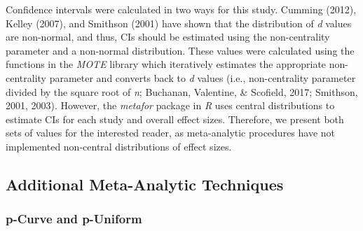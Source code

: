 \documentclass[man]{apa6}
\theoremstyle{definition}
\theoremstyle{definition}
\theoremstyle{definition}
\theoremstyle{remark}
\begin{document}
Confidence intervals were calculated in two ways for this study. Cumming
(2012), Kelley (2007), and Smithson (2001) have shown that the
distribution of \emph{d} values are non-normal, and thus, CIs should be
estimated using the non-centrality parameter and a non-normal
distribution. These values were calculated using the functions in the
\emph{MOTE} library which iteratively estimates the appropriate
non-centrality parameter and converts back to \emph{d} values (i.e.,
non-centrality parameter divided by the square root of \emph{n};
Buchanan, Valentine, \& Scofield, 2017; Smithson, 2001, 2003). However,
the \emph{metafor} package in \emph{R} uses central distributions to
estimate CIs for each study and overall effect sizes. Therefore, we
present both sets of values for the interested reader, as meta-analytic
procedures have not implemented non-central distributions of effect
sizes.

\subsection{Additional Meta-Analytic
Techniques}\label{additional-meta-analytic-techniques}

\subsubsection{p-Curve and p-Uniform}\label{p-curve-and-p-uniform}
\end{document}

